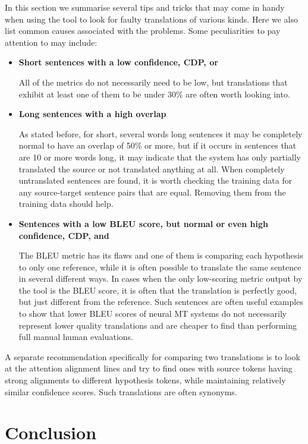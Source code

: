 \documentclass[runningheads,a4paper]{lncs/llncs}
\begin{document}
In this section we summarise several tips and tricks that may come in handy when using the tool to look for faulty translations of various kinds. Here we also list common causes associated with the problems. Some peculiarities to pay attention to may include:
  \begin{itemize}
    \item \textbf{Short sentences with a low confidence, CDP,  or } 
    
    All of the metrics do not necessarily need to be low, but translations that exhibit at least one of them to be under 30\% are often worth looking into.
    \item \textbf{Long sentences with a high overlap}
    
    As stated before, for short, several words long sentences it may be completely normal to have an overlap of 50\% or more, but if it occurs in sentences that are 10 or more words long, it may indicate that the system has only partially translated the source or not translated anything at all. When completely untranslated sentences are found, it is worth checking the training data for any source-target sentence pairs that are equal. Removing them from the training data should help.
    \item \textbf{Sentences with a low BLEU score, but normal or even high confidence, CDP,  and }
    
    The BLEU metric has its flaws and one of them is comparing each hypothesis to only one reference, while it is often possible to translate the same sentence in several different ways. In cases when the only low-scoring metric output by the tool is the BLEU score, it is often that the translation is perfectly good, but just different from the reference. Such sentences are often useful examples to show that lower BLEU scores of neural MT systems do not necessarily represent lower quality translations and are cheaper to find than performing full manual human evaluations.
  \end{itemize}

A separate recommendation specifically for comparing two translations is to look at the attention alignment lines and try to find ones with source tokens having strong alignments to different hypothesis tokens, while maintaining relatively similar confidence scores. Such translations are often synonyms.

\section{Conclusion}
\label{sec:conclusion}
\end{document}
